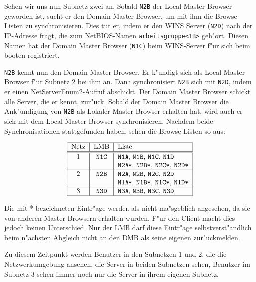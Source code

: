 \documentclass{scrartcl}\usepackage{pslatex}\typearea{12}
\newcommand{\nbname}{\texttt}
\begin{document}
Sehen wir uns nun Subnetz zwei an. Sobald \nbname{N2B} der Local Master
Browser geworden ist, sucht er den Domain Master Browser, um mit ihm
die Browse Listen zu synchronisieren. Dies tut er, indem er den WINS
Server (\nbname{N2D}) nach der IP-Adresse fragt, die zum NetBIOS-Namen
\nbname{arbeitsgruppe<1B>} geh"ort. Diesen Namen hat der Domain Master
Browser (\nbname{N1C}) beim WINS-Server f"ur sich beim booten
registriert.

\nbname{N2B} kennt nun den Domain Master Browser. Er k"undigt sich als
Local Master Browser f"ur Subnetz 2 bei ihm an. Dann synchronisiert
\nbname{N2B} sich mit \nbname{N2D}, indem er einen
NetServerEnum2-Aufruf abschickt. Der Domain Master Browser schickt
alle Server, die er kennt, zur"uck. Sobald der Domain Master Browser
die Ank"undigung von \nbname{N2B} als Lokaler Master Browser erhalten
hat, wird auch er sich mit dem Local Master Browser
synchronisieren. Nachdem beide Synchronisationen stattgefunden haben,
sehen die Browse Listen so aus:

\vspace{\baselineskip}
\[\begin{tabular}{|c|c|l|}
\hline
Netz & LMB &  Liste \\ \hline \hline
1 & \nbname{N1C} & \nbname{N1A}, \nbname{N1B}, \nbname{N1C}, \nbname{N1D}\\
  & & \nbname{N2A*}, \nbname{N2B*}, \nbname{N2C*}, \nbname{N2D*}\\
\hline
2 & \nbname{N2B} & \nbname{N2A}, \nbname{N2B}, \nbname{N2C}, \nbname{N2D}\\
& & \nbname{N1A*}, \nbname{N1B*}, \nbname{N1C*}, \nbname{N1D*}\\
\hline
3 & \nbname{N3D} & \nbname{N3A}, \nbname{N3B}, \nbname{N3C}, \nbname{N3D}\\
\hline
\end{tabular}\]
\vspace{\baselineskip}

Die mit * bezeichneten Eintr"age werden als nicht ma"sgeblich
angesehen, da sie von anderen Master Browsern erhalten wurden. F"ur
den Client macht dies jedoch keinen Unterschied. Nur der LMB darf
diese Eintr"age selbstverst"andlich beim n"achsten Abgleich nicht an
den DMB als seine eigenen zur"uckmelden.

Zu diesem Zeitpunkt werden Benutzer in den Subnetzen 1 und 2, die die
Netzwerkumgebung ansehen, die Server in beiden Subnetzen sehen,
Benutzer im Subnetz 3 sehen immer noch nur die Server in ihrem eigenen
Subnetz.
\end{document}
